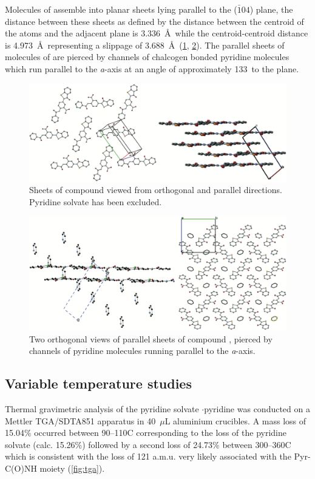Molecules of  assemble into planar sheets lying parallel to the ($\bar{1} 0 4$) plane, the distance between these sheets as defined by the distance between the centroid of the atoms  and the adjacent plane is 3.336~\AA~while the centroid-centroid distance is 4.973~\AA~representing a slippage of 3.688~\AA~(\ref{fig:ebs-nitroamide-2py-sheets-1}, \ref{fig:ebs-nitroamide-2py-sheets-2}).
The parallel sheets of molecules of  are pierced by channels of chalcogen bonded pyridine molecules which run parallel to the \emph{a}-axis at an angle of approximately 133\degree~to the plane.

\begin{figure}
    \centering
    \includegraphics[width=0.8\linewidth]{Figures/ebs-nitroamide-2py-sheets-1.png}
    \caption{Sheets of compound  viewed from orthogonal and parallel directions. Pyridine solvate has been excluded.}
    \label{fig:ebs-nitroamide-2py-sheets-1}
\end{figure}

\begin{figure}
    \centering
    \includegraphics[width=0.8\linewidth]{Figures/ebs-nitroamide-2py-sheets-2.png}
    \caption{Two orthogonal views of parallel sheets of compound , pierced by channels of pyridine molecules running parallel to the \emph{a}-axis.}
    \label{fig:ebs-nitroamide-2py-sheets-2}
\end{figure}

\subsection{Variable temperature studies}
Thermal gravimetric analysis of the pyridine solvate $\cdot$pyridine was conducted on a Mettler TGA/SDTA851 apparatus in 40~$\mu$L aluminium crucibles. 
A mass loss of 15.04\% occurred between 90--110\degree C corresponding to the loss of the pyridine solvate (calc. 15.26\%) followed by a second loss of 24.73\% between 300--360\degree C which is consistent with the loss of 121 a.m.u. very likely associated with the Pyr-C(O)NH moiety (\ref{fig:tga}).

